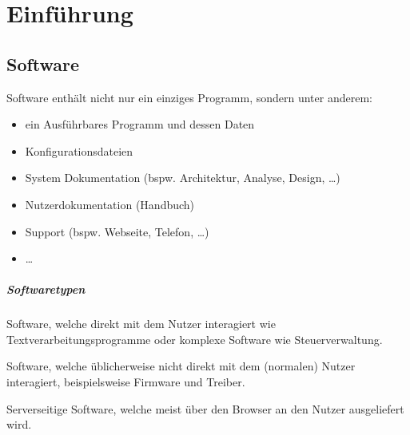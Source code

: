 \lstset{language = Java}



\chapter{Einführung}
	\section{Software}
		Software enthält nicht nur ein einziges Programm, sondern unter anderem:
		\begin{itemize}
			\item ein Ausführbares Programm und dessen Daten
			\item Konfigurationsdateien
			\item System Dokumentation (bspw. Architektur, Analyse, Design, \dots)
			\item Nutzerdokumentation (Handbuch)
			\item Support (bspw. Webseite, Telefon, \dots)
			\item \dots
		\end{itemize}
		
		\paragraph{Softwaretypen}
			\begin{description}[leftmargin = 5cm]
				\item[Applikationssoftware] Software, welche direkt mit dem Nutzer interagiert wie Textverarbeitungsprogramme oder komplexe Software wie Steuerverwaltung.
				\item[Systemsoftware] Software, welche üblicherweise nicht direkt mit dem (normalen) Nutzer interagiert, beispielsweise Firmware und Treiber.
				\item[Software as a Service (SaaS)] Serverseitige Software, welche meist über den Browser an den Nutzer ausgeliefert wird.
			\end{description}
	
